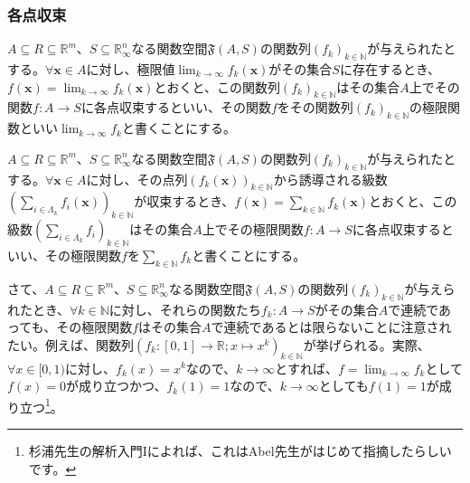 \documentclass[dvipdfmx]{jsarticle}
\begin{document}
\subsubsection{各点収束}%
\begin{dfn}
$A \subseteq R \subseteq \mathbb{R}^{m}$、$S \subseteq \mathbb{R}_{\infty}^{n}$なる関数空間$\mathfrak{F}(A,S)$の関数列$\left( f_{k} \right)_{k \in \mathbb{N}}$が与えられたとする。$\forall\mathbf{x} \in A$に対し、極限値$\lim_{k \rightarrow \infty}{f_{k}\left( \mathbf{x} \right)}$がその集合$S$に存在するとき、$f\left( \mathbf{x} \right) = \lim_{k \rightarrow \infty}{f_{k}\left( \mathbf{x} \right)}$とおくと、この関数列$\left( f_{k} \right)_{k \in \mathbb{N}}$はその集合$A$上でその関数$f:A \rightarrow S$に各点収束するといい、その関数$f$をその関数列$\left( f_{k} \right)_{k \in \mathbb{N}}$の極限関数といい$\lim_{k \rightarrow \infty}f_{k}$と書くことにする。
\end{dfn}
\begin{dfn}
$A \subseteq R \subseteq \mathbb{R}^{m}$、$S \subseteq \mathbb{R}_{\infty}^{n}$なる関数空間$\mathfrak{F}(A,S)$の関数列$\left( f_{k} \right)_{k \in \mathbb{N}}$が与えられたとする。$\forall\mathbf{x} \in A$に対し、その点列$\left( f_{k}\left( \mathbf{x} \right) \right)_{k \in \mathbb{N}}$から誘導される級数$\left( \sum_{i \in \varLambda_{k}} {f_{i}\left( \mathbf{x} \right)} \right)_{k \in \mathbb{N}}$が収束するとき、$f\left( \mathbf{x} \right) = \sum_{k \in \mathbb{N}} {f_{k}\left( \mathbf{x} \right)}$とおくと、この級数$\left( \sum_{i \in \varLambda_{k}} f_{i} \right)_{k \in \mathbb{N}}$はその集合$A$上でその極限関数$f:A \rightarrow S$に各点収束するといい、その極限関数$f$を$\sum_{k \in \mathbb{N}} f_{k}$と書くことにする。
\end{dfn}\par
さて、$A \subseteq R \subseteq \mathbb{R}^{m}$、$S \subseteq \mathbb{R}_{\infty}^{n}$なる関数空間$\mathfrak{F}(A,S)$の関数列$\left( f_{k} \right)_{k \in \mathbb{N}}$が与えられたとき、$\forall k \in \mathbb{N}$に対し、それらの関数たち$f_{k}:A \rightarrow S$がその集合$A$で連続であっても、その極限関数$f$はその集合$A$で連続であるとは限らないことに注意されたい。例えば、関数列$\left( f_{k}:[ 0,1] \rightarrow \mathbb{R};x \mapsto x^{k} \right)_{k \in \mathbb{N}}$が挙げられる。実際、$\forall x \in [ 0,1)$に対し、$f_{k}(x) = x^{k}$なので、$k \rightarrow \infty$とすれば、$f = \lim_{k \rightarrow \infty}f_{k}$として$f(x) = 0$が成り立つかつ、$f_{k}(1) = 1$なので、$k \rightarrow \infty$としても$f(1) = 1$が成り立つ\footnote{杉浦先生の解析入門Iによれば、これはAbel先生がはじめて指摘したらしいです。}。
\end{document}
